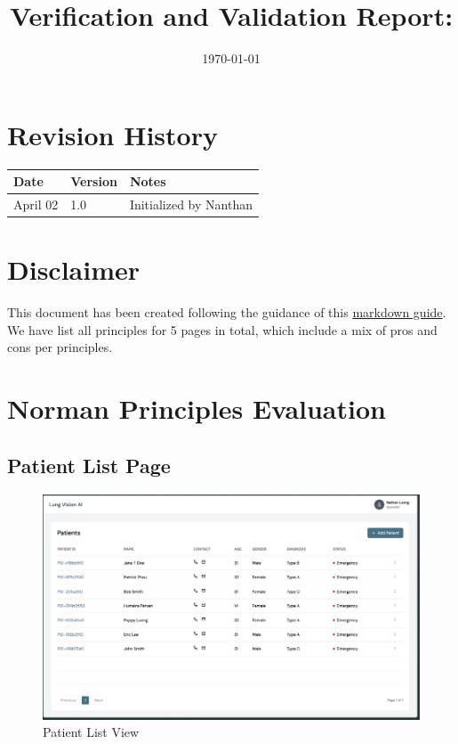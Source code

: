 \documentclass[12pt, titlepage]{article}
\begin{document}
\title{Verification and Validation Report: \progname} 
\author{\authname}
\date{\today}
	
\maketitle


\section{Revision History}
\begin{tabularx}{\textwidth}{p{3cm}p{2cm}X}
\toprule {\bf Date} & {\bf Version} & {\bf Notes}\\
\midrule
April 02 & 1.0 & Initialized by Nanthan\\

\bottomrule
\end{tabularx}


\newpage
\tableofcontents
\listoftables %
\listoffigures %

\section{Disclaimer}
This document has been created following the guidance of this \href{https://github.com/smiths/capTemplate/blob/main/docs/Extras/NormansPrinciples/Expectations.md}{markdown guide}. We have list all principles for 5 pages in total, which include a mix of pros and cons per principles.

\section{Norman Principles Evaluation}
\newpage



\subsection{Patient List Page}

  \begin{figure}[ht!] 
    \centering
    \includegraphics[scale=0.25]{../assets/patient_list.png}
    \caption{Patient List View}
    \label{fig:patient_list}
  \end{figure}
\end{document}
